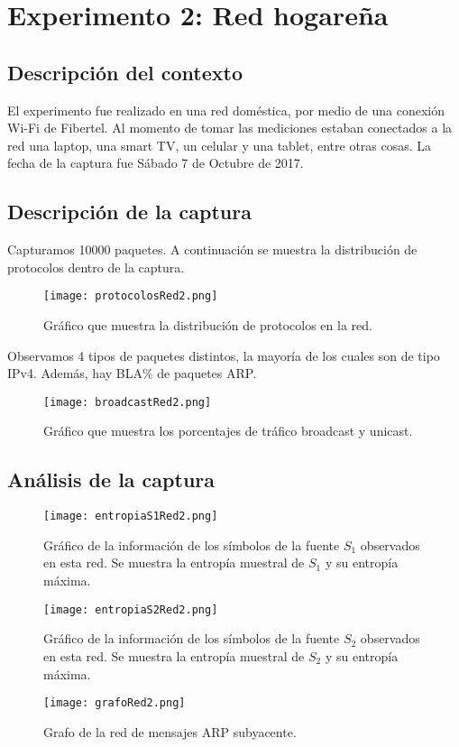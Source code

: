 \section{Experimento 2: Red hogareña}

\subsection{Descripción del contexto}

El experimento fue realizado en una red doméstica, por medio de una conexión Wi-Fi de Fibertel. Al momento de tomar las mediciones estaban conectados a la red una laptop, una smart TV, un celular y una tablet, entre otras cosas. La fecha de la captura fue Sábado 7 de Octubre de 2017.

\subsection{Descripción de la captura}

Capturamos 10000 paquetes. A continuación se muestra la distribución de protocolos dentro de la captura.
\begin{figure}[H]
\centering
\texttt{[image: protocolosRed2.png]}
\caption{Gráfico que muestra la distribución de protocolos en la red.}
\label{broadcast2}
\end{figure}

Observamos 4 tipos de paquetes distintos, la mayoría de los cuales son de tipo IPv4. Además, hay BLA\% de paquetes ARP.
\begin{figure}[H]
\centering
\texttt{[image: broadcastRed2.png]}
\caption{Gráfico que muestra los porcentajes de tráfico broadcast y unicast.}
\label{broadcast2}
\end{figure}

\subsection{Análisis de la captura}

\begin{figure}[H]
\centering
\texttt{[image: entropiaS1Red2.png]}
\caption{Gráfico de la información de los símbolos de la fuente $S_1$ observados en esta red. Se muestra la entropía muestral de $S_1$ y su entropía máxima.}
\label{entropias1_2}
\end{figure}

\begin{figure}[H]
\centering
\texttt{[image: entropiaS2Red2.png]}
\caption{Gráfico de la información de los símbolos de la fuente $S_2$ observados en esta red. Se muestra la entropía muestral de $S_2$ y su entropía máxima.}
\label{entropias2_2}
\end{figure}

\begin{figure}[H]
\centering
\texttt{[image: grafoRed2.png]}
\caption{Grafo de la red de mensajes ARP subyacente.}
\label{grafo2}
\end{figure}
